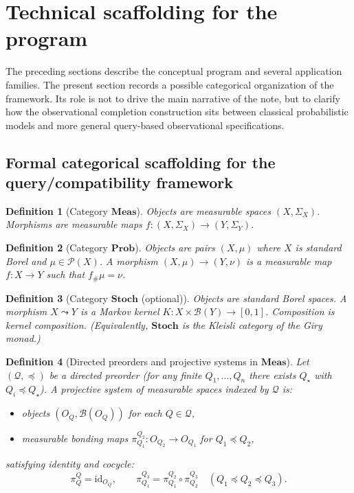 \documentclass[11pt]{article}
\newtheorem{definition}{Definition}
\begin{document}

\section{Technical scaffolding for the program}

The preceding sections describe the conceptual program and several
application families.  The present section records a possible categorical
organization of the framework.  Its role is not to drive the main
narrative of the note, but to clarify how the observational completion
construction sits between classical probabilistic models and more general
query-based observational specifications.

\subsection{Formal categorical scaffolding for the query/compatibility framework}

\begin{definition}[Category $\mathbf{Meas}$]
Objects are measurable spaces $(X,\Sigma_X)$. Morphisms are measurable maps
$f:(X,\Sigma_X)\to (Y,\Sigma_Y)$.
\end{definition}

\begin{definition}[Category $\mathbf{Prob}$]
Objects are pairs $(X,\mu)$ where $X$ is standard Borel and $\mu\in\mathcal P(X)$.
A morphism $(X,\mu)\to (Y,\nu)$ is a measurable map $f:X\to Y$ such that
$f_\#\mu=\nu$.
\end{definition}

\begin{definition}[Category $\mathbf{Stoch}$ (optional)]
Objects are standard Borel spaces. A morphism $X\leadsto Y$ is a Markov kernel
$K:X\times\mathcal B(Y)\to [0,1]$. Composition is kernel composition.
(Equivalently, $\mathbf{Stoch}$ is the Kleisli category of the Giry monad.)
\end{definition}


\begin{definition}[Directed preorders and projective systems in $\mathbf{Meas}$]
Let $(\mathcal Q,\preceq)$ be a directed preorder (for any finite $Q_1,\dots,Q_n$
there exists $Q_\star$ with $Q_i\preceq Q_\star$).
A \emph{projective system of measurable spaces} indexed by $\mathcal Q$ is:
\begin{itemize}
\item objects $(O_Q,\mathcal B(O_Q))$ for each $Q\in\mathcal Q$,
\item measurable bonding maps $\pi^{Q_2}_{Q_1}:O_{Q_2}\to O_{Q_1}$ for $Q_1\preceq Q_2$,
\end{itemize}
satisfying identity and cocycle:
\[
\pi^{Q}_{Q}=\mathrm{id}_{O_Q},\qquad
\pi^{Q_3}_{Q_1}=\pi^{Q_2}_{Q_1}\circ \pi^{Q_3}_{Q_2}\quad(Q_1\preceq Q_2\preceq Q_3).
\]
\end{definition}
\end{document}
